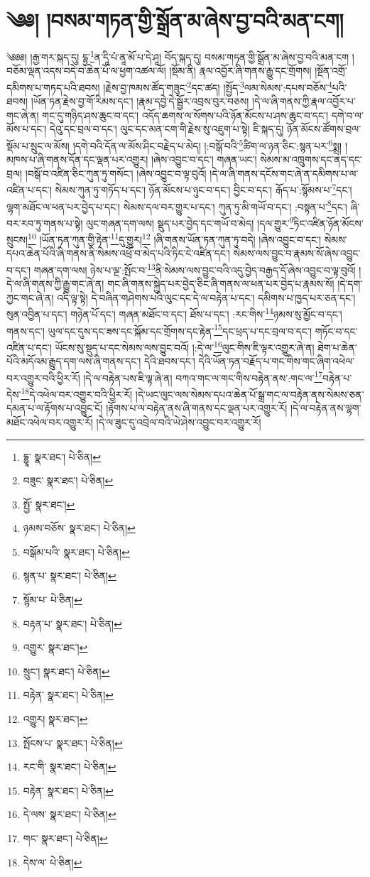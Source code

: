 \setcounter{footnote}{0} 
\chapter{༄༅། །བསམ་གཏན་གྱི་སྒྲོན་མ་ཞེས་བྱ་བའི་མན་ངག།}༄༅༅། །རྒྱ་གར་སྐད་དུ། དྷྱ་\footnote{དྷྱཱ་  སྣར་ཐང་།  པེ་ཅིན། }ན་དཱི་པཾ་ནཱ་མོ་པ་དེ་ཤཱ། བོད་སྐད་དུ། བསམ་གཏན་གྱི་སྒྲོན་མ་ཞེས་བྱ་བའི་མན་ངག །བཅོམ་ལྡན་འདས་བདེ་བ་ཆེན་པོ་ལ་ཕྱག་འཚལ་ལོ། །སྡོམ་ནི། རྣལ་འབྱོར་ཞི་གནས་རྒྱུ་དང་གྲོགས། །སྔོན་འགྲོ་དམིགས་པ་གཏད་པའི་ཐབས། །རྗེས་བྱ་ཁམས་ཚོད་གཟུང་\footnote{བཟུང་  སྣར་ཐང་།  པེ་ཅིན། }དང་ཚད། །སྤྱོད་\footnote{སྤྱོ་  སྣར་ཐང་། }ལམ་སེམས་:དཔས་བཅོས་\footnote{ཉམས་བཅོས་  སྣར་ཐང་།  པེ་ཅིན། }པའི་ཐབས། །ཡོན་ཏན་རྗེས་བྱ་གོ་རིམས་དང་། །རྣམ་དབྱེ་དེ་སྦྱོར་འབྲས་བུར་བཅས། །དེ་ལ་ཞི་གནས་ཀྱི་རྣལ་འབྱོར་པ་གང་ཞེ་ན། གང་དུ་གཉིད་ཤས་ཆུང་བ་དང་། འདོད་ཆགས་ལ་སོགས་པའི་ཉོན་མོངས་པ་ཤས་ཆུང་བ་དང་། དགེ་བ་ལ་མོས་པ་དང་། དེའུ་དང་བྲལ་བ་དང་། ལུང་དང་མན་ངག་གི་རྗེས་སུ་འཇུག་པ་སྟེ། ཇི་སྐད་དུ། ཉོན་མོངས་ཚོགས་བྲལ་སྡོམ་པ་སྲུང་ལ་མོས། །དགེ་བའི་དོན་ལ་མོས་ཤིང་བརྗེད་པ་མེད། །:བསྒོ་བའི་\footnote{བསྒོམ་པའི་  སྣར་ཐང་།  པེ་ཅིན། }ཚིག་ལ་ཉན་ཅིང་:སྙན་པར་\footnote{སྙན་པ་  སྣར་ཐང་།  པེ་ཅིན། }སྨྲ། །མཁས་པ་ཞི་གནས་དོན་དང་ལྡན་པར་འགྱུར། །ཞེས་འབྱུང་བ་དང་། གཞན་ཡང་། སེམས་མ་འཁྲུགས་དང་ནད་དང་བྲལ། །བསྒོ་བ་འཛིན་ཅིང་ཀུན་ཏུ་གསོང་། །ཞེས་འབྱུང་བ་ལྟ་བུའོ། །དེ་ལ་ཞི་གནས་དངོས་གང་ཞེ་ན་དམིགས་པ་ལ་འཛིན་པ་དང་། སེམས་ཀུན་ཏུ་གཏོད་པ་དང་། ཉོན་མོངས་པ་ཉུང་བ་དང་། བྱིང་བ་དང་། རྒོད་པ་:སྙོམས་པ་\footnote{སྙོམ་པ་  པེ་ཅིན། }དང་། ལྷག་མཐོང་ལ་ཕན་པར་བྱེད་པ་དང་། སེམས་དལ་བར་གྱུར་པ་དང་། ཀུན་ཏུ་མི་གཡོ་བ་དང་། :བསྟན་པ་\footnote{བརྟན་པ་  སྣར་ཐང་།  པེ་ཅིན། }དང་། ཞི་བར་རབ་ཏུ་གནས་པ་སྟེ། ལུང་གཞན་དག་ལས། སྡུད་པར་བྱེད་དང་གཡོ་བ་མེད། །དལ་གྱུར་\footnote{འགྱུར་  སྣར་ཐང་། }ཏིང་འཛིན་ཉོན་མོངས་སྲུངས།\footnote{སྲུང་།  སྣར་ཐང་།  པེ་ཅིན། } །ཡོན་ཏན་ཀུན་གྱི་རྟེན་\footnote{བརྟེན་  སྣར་ཐང་།  པེ་ཅིན། }དུ་གྱུར།\footnote{འགྱུར།  སྣར་ཐང་། } །ཞི་གནས་ཡོན་ཏན་ཀུན་ཏུ་བདེ། །ཞེས་འབྱུང་བ་དང་། སེམས་དཔའ་ཆེན་པོའི་ཞི་གནས་ནི་སེམས་འཕྲོ་བ་མེད་པའི་ཏིང་ངེ་འཛིན་དང་། སེམས་ལས་བྱུང་བ་རྣམས་སོ་ཞེས་འབྱུང་བ་དང་། གཞན་དག་ལས། ཉེས་པ་ལྔ་:སྤོང་བ་\footnote{སྤོངས་པ་  སྣར་ཐང་།  པེ་ཅིན། }ནི་སེམས་ལས་བྱུང་བའི་འདུ་བྱེད་བརྒྱད་དོ་ཞེས་འབྱུང་བ་ལྟ་བུའོ། །དེ་ལ་ཞི་གནས་ཀྱི་རྒྱུ་གང་ཞེ་ན། གང་ཞི་གནས་སྐྱེད་པར་བྱེད་ཅིང་ཞི་གནས་ལ་ཕན་པར་བྱེད་པ་རྣམས་སོ། །དེ་དག་ཀྱང་གང་ཞེ་ན། འདི་ལྟ་སྟེ། དེ་བཞིན་གཤེགས་པའི་ལུང་དང་དེ་ལ་བརྟེན་པ་དང་། དམིགས་པ་ཁྱད་པར་ཅན་དང་། སུན་འབྱིན་པ་དང་། གཉེན་པོ་དང་། གཞན་མཐོང་བ་དང་། ཐོས་པ་དང་། :རང་གིས་\footnote{རང་གི་  སྣར་ཐང་།  པེ་ཅིན། }ཉམས་སུ་མྱོང་བ་དང་། གནས་དང་། ཡུལ་དང་དུས་དང་ཟས་དང་སྐོམ་དང་གྲོགས་དང་རྟེན་\footnote{བརྟེན་  སྣར་ཐང་།  པེ་ཅིན། }དང་ཕྲད་པ་དང་བྲལ་བ་དང་། གཏོང་བ་དང་འཛིན་པ་དང་། ཡོངས་སུ་སྡུད་པ་དང་སེམས་ལས་བྱུང་བའོ། །:དེ་ལ་\footnote{དེ་ལས་  སྣར་ཐང་།  པེ་ཅིན། }ལུང་གིས་ཇི་ལྟར་འགྱུར་ཞེ་ན། ཐེག་པ་ཆེན་པོའི་མདོའམ་རྒྱུད་དག་ལས་ཞི་གནས་དང་། དེའི་ཐབས་དང་། དེའི་ཡོན་ཏན་བརྗོད་པ་གང་གིས་གང་ཞིག་འཕེལ་བར་འགྱུར་བའི་ཕྱིར་རོ། །དེ་ལ་བརྟེན་པས་ཇི་ལྟ་ཞེ་ན། བཀའ་གང་ལ་གང་གིས་བརྟེན་ནས་:གང་ལ་\footnote{གང་  སྣར་ཐང་།  པེ་ཅིན། }བརྟེན་པ་དེས་\footnote{དེས་ལ་  པེ་ཅིན། }དེ་འཕེལ་བར་འགྱུར་བའི་ཕྱིར་རོ། །དེ་ཡང་ལུང་ལས་སེམས་དཔའ་ཆེན་པོ་སྒྲ་གང་ལ་བརྟེན་ནས་སེམས་ཅན་དམན་པ་ལ་རྟོགས་པ་འབྱུང་ངོ། །རྟོགས་པ་ལ་བརྟེན་ནས་ཞི་གནས་དང་ལྡན་པར་འགྱུར་རོ། །དེ་ལ་བརྟེན་ནས་ལྷག་མཐོང་འཕེལ་བར་འགྱུར་རོ། །དེ་ལ་ཟུང་དུ་འབྲེལ་བའི་ཡེ་ཤེས་འབྱུང་བར་འགྱུར་རོ། 